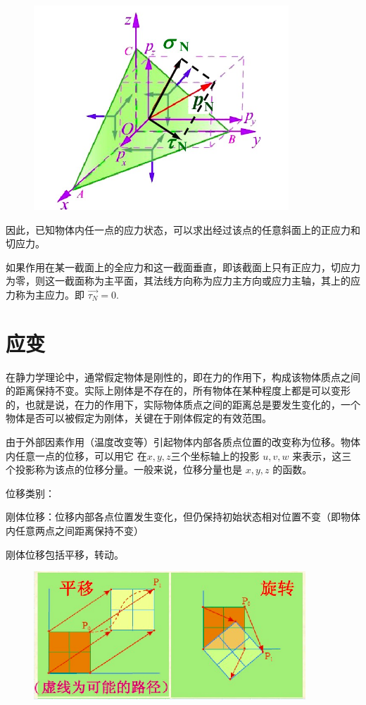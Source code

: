 \documentclass[12pt,a4paper]{article}
\begin{document}
\begin{figure}[H]
\centering
\includegraphics[scale=0.5]{./figures/9.png}
\caption{}
\end{figure}

因此，已知物体内任一点的应力状态，可以求出经过该点的任意斜面上的正应力和切应力。

如果作用在某一截面上的全应力和这一截面垂直，即该截面上只有正应力，切应力为零，则这一截面称为主平面，其法线方向称为应力主方向或应力主轴，其上的应力称为主应力。即 $\overrightarrow{\tau_N}=0$.

\section{应变}
在静力学理论中，通常假定物体是刚性的，即在力的作用下，构成该物体质点之间的距离保持不变。实际上刚体是不存在的，所有物体在某种程度上都是可以变形的，也就是说，在力的作用下，实际物体质点之间的距离总是要发生变化的，一个物体是否可以被假定为刚体，关键在于刚体假定的有效范围。

由于外部因素作用（温度改变等）引起物体内部各质点位置的改变称为位移。物体内任意一点的位移，可以用它 在$x,y,z$三个坐标轴上的投影 $u,v,w$ 来表示，这三个投影称为该点的位移分量。一般来说，位移分量也是 $x,y,z$ 的函数。

位移类别：

刚体位移：位移内部各点位置发生变化，但仍保持初始状态相对位置不变（即物体内任意两点之间距离保持不变）

刚体位移包括平移，转动。

\begin{figure}[H]
\centering
\includegraphics[scale=0.5]{./figures/10.png}
\caption{}
\end{figure}
\end{document}
